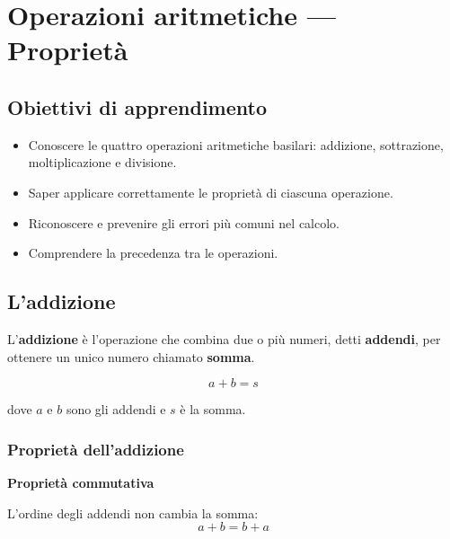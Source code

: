 
\chapter{Operazioni aritmetiche --- Proprietà}

\section*{Obiettivi di apprendimento}
\begin{itemize}
  \item Conoscere le quattro operazioni aritmetiche basilari: addizione, sottrazione, moltiplicazione e divisione.
  \item Saper applicare correttamente le proprietà di ciascuna operazione.
  \item Riconoscere e prevenire gli errori più comuni nel calcolo.
  \item Comprendere la precedenza tra le operazioni.
\end{itemize}

\bigskip

\section{L'addizione}

\begin{definizione}
  L'\textbf{addizione} è l'operazione che combina due o più numeri, detti \textbf{addendi}, per ottenere un unico numero chiamato \textbf{somma}.

  \[
    a + b = s
  \]

  dove $a$ e $b$ sono gli addendi e $s$ è la somma.
\end{definizione}

\subsection{Proprietà dell'addizione}

\begin{regola}
  \textbf{Proprietà commutativa}

  L'ordine degli addendi non cambia la somma:
  \[
    a + b = b + a
  \]
\end{regola}

